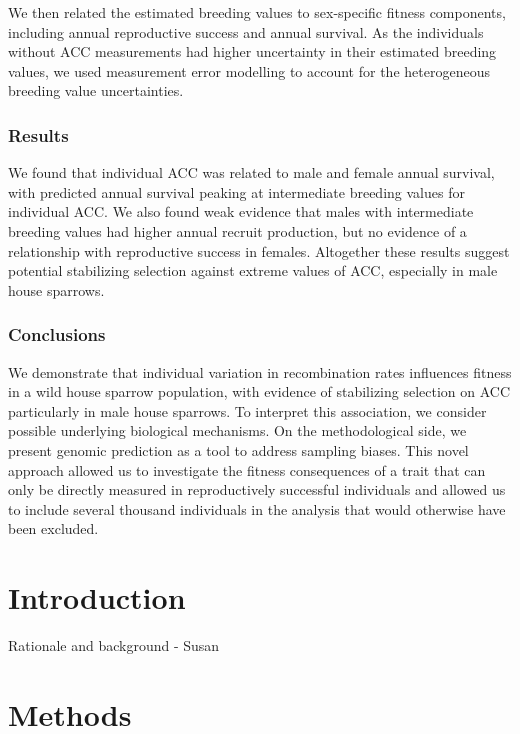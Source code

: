 \documentclass[dvipsnames]{article}
\begin{document}
We then related the estimated breeding values to sex-specific fitness components, including annual reproductive success and annual survival. As the individuals without ACC measurements had higher uncertainty in their estimated breeding values, we used measurement error modelling to account for the heterogeneous breeding value uncertainties. 

\subsubsection*{Results}
We found that individual ACC was related to male and female annual survival, with predicted annual survival peaking at intermediate breeding values for individual ACC. We also found weak evidence that males with intermediate breeding values had higher annual recruit production, but no evidence of a relationship with reproductive success in females. Altogether these results suggest potential stabilizing selection against extreme values of ACC, especially in male house sparrows.

\subsubsection*{Conclusions}
We demonstrate that individual variation in recombination rates influences fitness in a wild house sparrow population, with evidence of stabilizing selection on ACC particularly in male house sparrows. To interpret this association, we consider possible underlying biological mechanisms. On the methodological side, we present genomic prediction as a tool to address sampling biases. This novel approach allowed us to investigate the fitness consequences of a trait that can only be directly measured in reproductively successful individuals and allowed us to include several thousand individuals in the analysis that would otherwise have been excluded.

\section*{Introduction}

Rationale and background - Susan





    

\section*{Methods}
\end{document}
